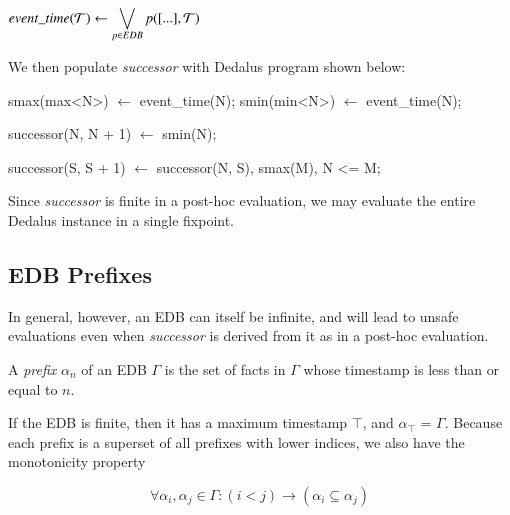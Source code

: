 $event\_time(\mathcal{T}) \leftarrow \displaystyle\bigvee_{p \in EDB} p([...], \mathcal{T})$


We then populate \emph{successor} with Dedalus program shown below:

\begin{Dedalus}
smax(max<N>) \(\leftarrow\) event\_time(N);
smin(min<N>) \(\leftarrow\) event\_time(N);

successor(N, N + 1) \(\leftarrow\) smin(N);

successor(S, S + 1) \(\leftarrow\) 
    successor(N, S),
    smax(M),
    N <= M;
\end{Dedalus}

Since {\em successor} is finite in a post-hoc evaluation, we may evaluate the
entire Dedalus instance in a single fixpoint.


\subsection{EDB Prefixes}

In general, however, an EDB can itself be infinite, and will lead to unsafe evaluations even when \emph{successor} is derived from it
as in a post-hoc evaluation.

\begin{definition}
A \emph{prefix} $\alpha_{n}$ of an EDB $\Gamma$ is the set of facts in $\Gamma$ whose timestamp is less than or equal to $n$.
\end{definition}

If the EDB is finite, then it has a maximum timestamp $\top$, and $\alpha_{\top}$ = $\Gamma$.  Because each prefix is a superset of all 
prefixes with lower indices, we also have the monotonicity property

\begin{equation}
\forall \alpha_{i}, \alpha_{j} \in \Gamma : (i < j) \to (\alpha_{i} \subseteq \alpha_{j})
\end{equation}

